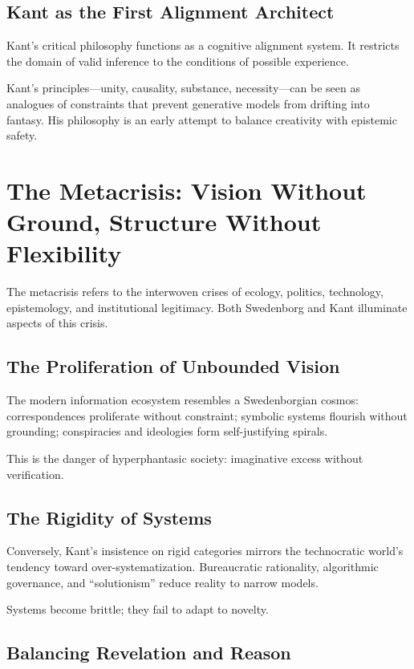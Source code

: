 \documentclass[12pt]{article}
\begin{document}
\subsection{Kant as the First Alignment Architect}

Kant’s critical philosophy functions as a cognitive alignment system. It 
restricts the domain of valid inference to the conditions of possible 
experience.

Kant’s principles---unity, causality, substance, necessity---can be seen as 
analogues of constraints that prevent generative models from drifting into 
fantasy. His philosophy is an early attempt to balance creativity with 
epistemic safety.

\section{The Metacrisis: Vision Without Ground, Structure Without Flexibility}

The metacrisis refers to the interwoven crises of ecology, politics, 
technology, epistemology, and institutional legitimacy. Both Swedenborg and 
Kant illuminate aspects of this crisis.

\subsection{The Proliferation of Unbounded Vision}

The modern information ecosystem resembles a Swedenborgian cosmos:  
correspondences proliferate without constraint; symbolic systems flourish 
without grounding; conspiracies and ideologies form self-justifying spirals.

This is the danger of hyperphantasic society: imaginative excess without 
verification.

\subsection{The Rigidity of Systems}

Conversely, Kant’s insistence on rigid categories mirrors the technocratic 
world’s tendency toward over-systematization. Bureaucratic rationality, 
algorithmic governance, and ``solutionism'' reduce reality to narrow models.

Systems become brittle; they fail to adapt to novelty.

\subsection{Balancing Revelation and Reason}
\end{document}

